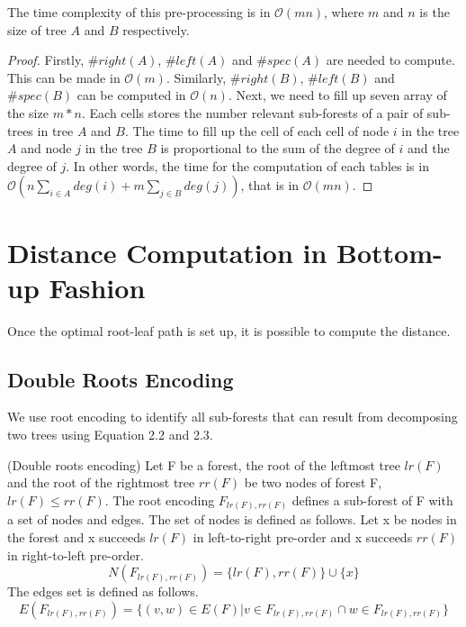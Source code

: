 \begin{lemma}
The time complexity of this pre-processing is in $\mathcal{O}(mn)$, where $m$ and $n$ is the size of tree $A$ and $B$ respectively.
\end{lemma}
\begin{proof}
Firstly, $\#right(A)$, $\#left(A)$ and $\#spec(A)$ are needed to compute. This can be made in $\mathcal{O}(m)$. Similarly, $\#right(B)$, $\#left(B)$ and $\#spec(B)$ can be computed in $\mathcal{O}(n)$. Next, we need to fill up seven array of the size $m * n$. Each cells stores the number relevant sub-forests of a pair of sub-trees in tree $A$ and $B$. The time to fill up the cell of each cell of node $i$ in the tree $A$ and node $j$ in the tree $B$ is proportional to the sum of the degree of $i$ and the degree of $j$. In other words, the time for the computation of each tables is in $\mathcal{O}(n\sum_{i \in A}deg(i) + m \sum_{j \in B}deg(j))$, that is in $\mathcal{O}(mn)$. 
\end{proof}

\section{Distance Computation in Bottom-up Fashion}
Once the optimal root-leaf path is set up, it is possible to compute the distance. 
\subsection{Double Roots Encoding}
We use root encoding to identify all sub-forests that can result from decomposing two trees using Equation 2.2 and 2.3.  
\begin{definition}
(Double roots encoding)
Let F be a forest, the root of the leftmost tree $lr(F)$ and the root of the rightmost tree $rr(F)$ be two nodes of forest F, $lr(F) \leq rr(F)$. The root encoding $F_{lr(F), rr(F)}$ defines a sub-forest of F with a set of nodes and edges. The set of nodes is defined as follows. Let x be nodes in the forest and  x succeeds $lr(F)$ in left-to-right pre-order and x succeeds $rr(F)$ in right-to-left pre-order.  
\begin{equation*}
N(F_{lr(F), rr(F)}) = \{lr(F), rr(F)\} \cup \{x\}
\end{equation*}
The edges set is defined as follows.
\begin{equation*}
E(F_{lr(F), rr(F)}) = \{(v, w) \in E(F) | v \in F_{lr(F), rr(F)} \cap w \in F_{lr(F), rr(F)}\}
\end{equation*}
\end{definition}

